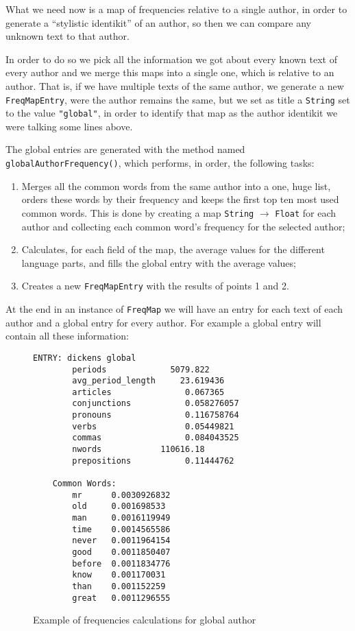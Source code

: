 \documentclass[a4paper,11pt, twoside]{article}
\begin{document}
		\bigskip

		\noindent
		What we need now is a map of frequencies relative to a single author, in order to generate a ``stylistic identikit''  of an author, so then we can compare any unknown text to that author.

		\noindent
		In order to do so we pick all the information we got about every known text of every author and we merge this maps into a single one, which is relative to an author. That is, if we have multiple texts of the same author, we generate a new \lstinline|FreqMapEntry|, were the author remains the same, but we set as title a \lstinline|String| set to the value \lstinline|"global"|, in order to identify that map as the author identikit we were talking some lines above.

		\bigskip
		\noindent
		The global entries are generated with the method named \lstinline|globalAuthorFrequency()|, which performs, in order, the following tasks: 
		\begin{enumerate}
			\item Merges all the common words from the same author into a one, huge list, orders these words by their frequency and keeps the first top ten most used common words. This is done by creating a map \lstinline|String| $\to$ \lstinline|Float| for each author and collecting each common word's frequency for the selected author;
			\item Calculates, for each field of the map, the average values for the different language parts, and fills the global entry with the average values;
			\item Creates a new \lstinline|FreqMapEntry| with the results of points 1 and 2.
		\end{enumerate}

		\bigskip
		\noindent
		At the end in an instance of \lstinline|FreqMap| we will have an entry for each text of each author and a global entry for every author. For example a global entry will contain all these information:
		\begin{figure}[h!]
			\centering
			\begin{BVerbatim}[fontsize=\footnotesize]
	ENTRY: dickens global
		periods             5079.822
		avg_period_length     23.619436
		articles               0.067365
		conjunctions           0.058276057
		pronouns               0.116758764
		verbs                  0.05449821
		commas                 0.084043525
		nwords            110616.18
		prepositions           0.11444762
	
	Common Words:
		mr      0.0030926832
		old     0.001698533
		man     0.0016119949
		time    0.0014565586
		never   0.0011964154
		good    0.0011850407
		before  0.0011834776
		know    0.001170031
		than    0.001152259
		great   0.0011296555
		\end{BVerbatim}
		\caption{Example of frequencies calculations for global author}
		\label{fig:freq-auth}
	\end{figure}
\end{document}
